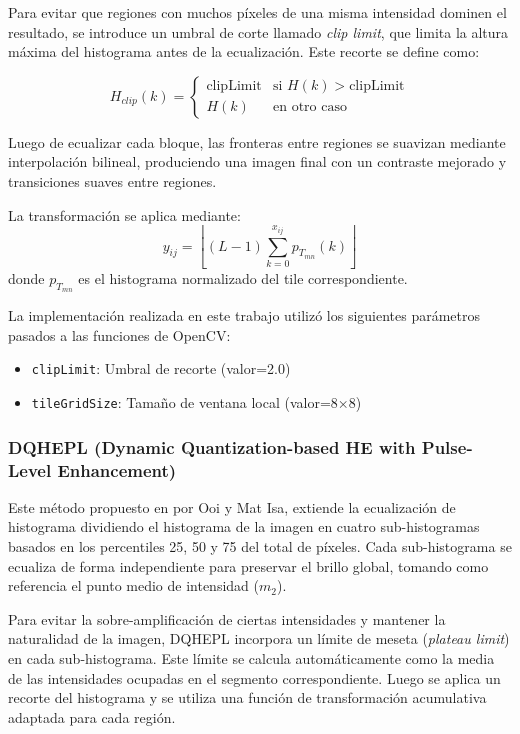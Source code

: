 \documentclass[sigchi]{acmart}
\begin{document}
Para evitar que regiones con muchos píxeles de una misma intensidad dominen el resultado,
se introduce un umbral de corte llamado \textit{clip limit}, que limita la altura máxima del
histograma antes de la ecualización. Este recorte se define como:

\begin{equation}
	H_{clip}(k) =
	\begin{cases}
		\text{clipLimit} & \text{si } H(k) > \text{clipLimit} \\
		H(k)             & \text{en otro caso}
	\end{cases}
\end{equation}

Luego de ecualizar cada bloque, las fronteras entre regiones se suavizan mediante interpolación
bilineal, produciendo una imagen final con un contraste mejorado y transiciones suaves entre
regiones.

La transformación se aplica mediante:
\begin{equation}
	y_{ij} = \left\lfloor (L-1) \sum_{k=0}^{x_{ij}} p_{T_{mn}}(k) \right\rfloor
\end{equation}
donde $p_{T_{mn}}$ es el histograma normalizado del tile correspondiente.

La implementación realizada en este trabajo utilizó los siguientes parámetros pasados a las
funciones de OpenCV:
\begin{itemize}
	\item \texttt{clipLimit}: Umbral de recorte (valor=2.0)
	\item \texttt{tileGridSize}: Tamaño de ventana local (valor=8×8)
\end{itemize}

\subsubsection{\textbf{DQHEPL (Dynamic Quantization-based HE with Pulse-Level Enhancement)}}
\label{sssec:dqhepl}

Este método propuesto en por Ooi y Mat Isa\cite{paper}, extiende la ecualización de histograma
dividiendo el histograma de la imagen en cuatro sub-histogramas basados en los percentiles 25,
50 y 75 del total de píxeles. Cada sub-histograma se ecualiza de forma independiente para
preservar el brillo global, tomando como referencia el punto medio de intensidad (\(m_2\)).

Para evitar la sobre-amplificación de ciertas intensidades y mantener la naturalidad de la
imagen, DQHEPL incorpora un límite de meseta (\textit{plateau limit}) en cada sub-histograma.
Este límite se calcula automáticamente como la media de las intensidades ocupadas en el
segmento correspondiente. Luego se aplica un recorte del histograma y se utiliza una función de
transformación acumulativa adaptada para cada región.
\end{document}
